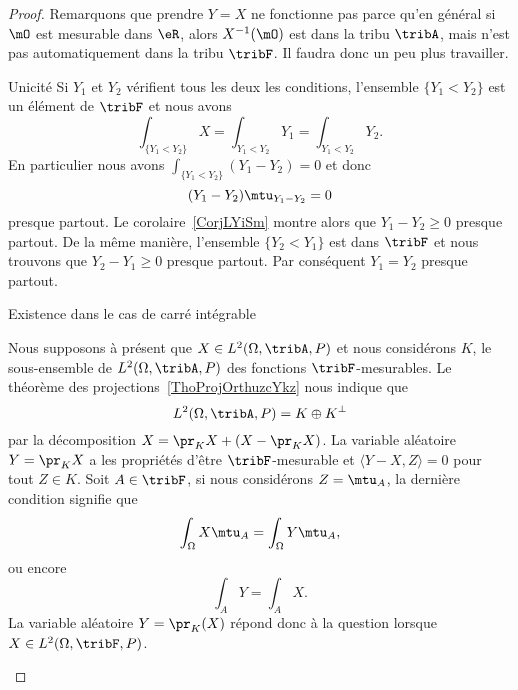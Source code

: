 \begin{proof}
        Remarquons que prendre \( Y=X\) ne fonctionne pas parce qu'en général si \( \mO\) est mesurable dans \( \eR\), alors \( X^{-1}(\mO)\) est dans la tribu \( \tribA\), mais n'est pas automatiquement dans la tribu \( \tribF\). Il faudra donc un peu plus travailler.
    \begin{subproof}
        \item[Unicité] Si \( Y_1\) et \( Y_2\) vérifient tous les deux les conditions, l'ensemble \( \{ Y_1<Y_2 \}\) est un élément de \( \tribF\) et nous avons
            \begin{equation}
                \int_{\{ Y_1<Y_2 \}}X=\int_{Y_1<Y_2}Y_1=\int_{Y_1<Y_2}Y_2.
            \end{equation}
            En particulier nous avons \( \int_{\{ Y_1<Y_2 \}}(Y_1-Y_2)=0\) et donc
            \begin{equation}
                (Y_1-Y_2)\mtu_{Y_1-Y_2}=0
            \end{equation}
            presque partout. Le corolaire~\ref{CorjLYiSm} montre alors que \( Y_1-Y_2\geq 0\) presque partout. De la même manière, l'ensemble \( \{ Y_2<Y_1 \}\) est dans \( \tribF\) et nous trouvons que \( Y_2-Y_1\geq 0\) presque partout. Par conséquent \( Y_1=Y_2\) presque partout.
        \item[Existence dans le cas de carré intégrable]

            Nous supposons à présent que \( X\in L^2(\Omega,\tribA,P)\) et nous considérons \( K\), le sous-ensemble de \( L^2(\Omega,\tribA,P)\) des fonctions \( \tribF\)-mesurables. Le théorème des projections~\ref{ThoProjOrthuzcYkz} nous indique que
            \begin{equation}
                L^2(\Omega,\tribA,P)=K\oplus K^{\perp}
            \end{equation}
            par la décomposition \( X=\pr_{K}X+(X-\pr_KX)\). La variable aléatoire \( Y=\pr_KX\) a les propriétés d'être \( \tribF\)-mesurable et \( \langle Y-X, Z\rangle =0\) pour tout \( Z\in K\). Soit \( A\in\tribF\), si nous considérons \( Z=\mtu_A\), la dernière condition signifie que
            \begin{equation}
                \int_{\Omega}X\mtu_A=\int_{\Omega}Y\mtu_A,
            \end{equation}
            ou encore
            \begin{equation}
                \int_AY=\int_AX.
            \end{equation}
            La variable aléatoire \( Y=\pr_K(X)\) répond donc à la question lorsque \( X\in L^2(\Omega,\tribF,P)\).


\end{subproof}
\end{proof}
